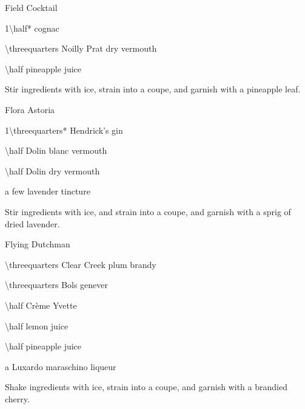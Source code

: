 \begin{PDTCocktail}{Field Cocktail}
	\begin{Ingredients}
	\item \SI{1\half*}{\oz} cognac
	\item \SI{\threequarters}{\oz} Noilly Prat dry vermouth
	\item \SI{\half}{\oz} pineapple juice
	\end{Ingredients}
	
	\begin{Instructions}
	Stir ingredients with ice, strain into a coupe, and garnish with a pineapple leaf.
	\end{Instructions}
\end{PDTCocktail}

\begin{PDTCocktail}{Flora Astoria}
	\begin{Ingredients}
	\item \SI{1\threequarters*}{\oz} Hendrick's gin
	\item \SI{\half}{\oz} Dolin blanc vermouth
	\item \SI{\half}{\oz} Dolin dry vermouth
	\item a few \si{\drops} lavender tincture
	\end{Ingredients}
	
	\begin{Instructions}
	Stir ingredients with ice, and strain into a coupe, and garnish with a sprig of dried lavender.
	\end{Instructions}
\end{PDTCocktail}

\begin{PDTCocktail}{Flying Dutchman}
	\begin{Ingredients}
	\item \SI{\threequarters}{\oz} Clear Creek plum brandy
	\item \SI{\threequarters}{\oz} Bols genever
	\item \SI{\half}{\oz} Cr\`eme Yvette
	\item \SI{\half}{\oz} lemon juice
	\item \SI{\half}{\oz} pineapple juice
	\item a \si{\dash} Luxardo maraschino liqueur
	\end{Ingredients}
	
	\begin{Instructions}
	Shake ingredients with ice, strain into a coupe, and garnish with a brandied cherry.
	\end{Instructions}
\end{PDTCocktail}


